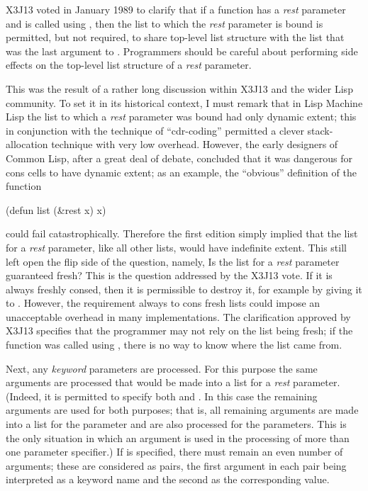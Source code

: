 \begin{new}
X3J13 voted in January 1989
to clarify that if a function has a \emph{rest} parameter
and is called using , then the list to which the
\emph{rest} parameter is bound is permitted, but not required,
to share top-level list structure with the list that was the last
argument to .  Programmers should be careful about performing
side effects on the top-level list structure of a \emph{rest} parameter.

This was the result of a rather long discussion within X3J13 and the
wider Lisp community.  To set it in its historical context, I must remark
that in Lisp Machine Lisp the list to which a \emph{rest} parameter was
bound had only dynamic extent; this in conjunction with the
technique of ``cdr-coding'' permitted a clever stack-allocation technique
with very low overhead.  However, the early designers of
Common Lisp, after a great deal of debate, concluded that it was dangerous
for cons cells to have dynamic extent; as an example, the ``obvious''
definition of the function 
\begin{lisp}
(defun list (\&rest x) x)
\end{lisp}
could fail catastrophically.  Therefore the first edition simply implied
that the list for a \emph{rest} parameter, like all other lists, would
have indefinite extent.  This still left open the flip side of the
question, namely, Is the list for a \emph{rest} parameter guaranteed fresh?
This is the question addressed by the X3J13 vote.
If it is always freshly consed, then it is permissible to destroy it,
for example by giving it to .  However, the requirement always
to cons fresh lists could impose an unacceptable overhead in many implementations.
The clarification approved by X3J13 specifies that the programmer may
not rely on the list being fresh; if the function was called using ,
there is no way to know where the list came from.
\end{new}

Next, any \emph{keyword} parameters are processed.
For this purpose the same arguments are processed that
would be made into a list for a \emph{rest} parameter.
(Indeed, it is permitted to specify both  and .
In this case the remaining arguments are used for both purposes;
that is, all remaining arguments are made into a list for the
 parameter and are also processed for the  parameters.
This is the only situation in which an argument is used
in the processing of more than one parameter specifier.)
If  is specified, there must remain
an even number of arguments; these are considered as pairs,
the first argument in each pair being interpreted as a keyword name
and the second as the corresponding value.

